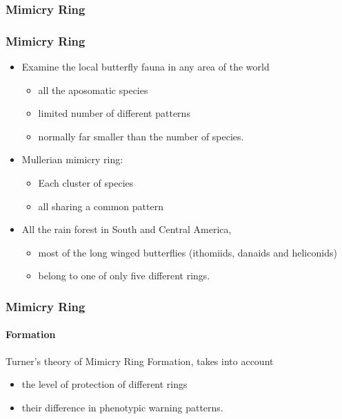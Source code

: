\subsubsection{Mimicry Ring}

\frame
{
	\frametitle{Mimicry Ring}
	
	\begin{itemize}
		\item Examine the local butterfly fauna in any area of the world
		\begin{itemize}
			\item all the aposomatic species
			\item limited number of different patterns
			\item normally far smaller than the number of species.
		\end{itemize}
		\item Mullerian mimicry ring: 
			\begin{itemize}
				\item Each cluster of species
				\item all sharing a common pattern
			\end{itemize}		
		\item All the rain forest in South and Central America,
		\begin{itemize}
			\item most of the long winged butterflies (ithomiids, danaids and heliconids) 
			\item belong to one of only five different rings.
		\end{itemize}
	\end{itemize}	
}

\frame
{
	\frametitle{Mimicry Ring}
	\framesubtitle{Formation}
	
	Turner's theory of Mimicry Ring Formation, takes into account
	\begin{itemize}
		\item the level of protection of different rings
		\item their difference in phenotypic warning patterns.
	\end{itemize}
	
}

